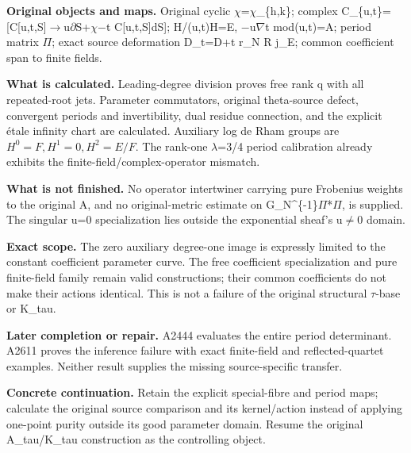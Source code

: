 \textbf{Original objects and maps.} Original cyclic
\allowbreak{}\ensuremath{χ}\allowbreak{}=\allowbreak{}\ensuremath{χ}\allowbreak{}\_\{h,k\};
complex
C\_\{u,t\}=[C[u,t,S]\allowbreak{}\ensuremath{→}\allowbreak{}u\allowbreak{}\ensuremath{∂}\allowbreak{}S+\allowbreak{}\ensuremath{χ}\allowbreak{}\allowbreak{}\ensuremath{−}\allowbreak{}t
C{[}u,t,S{]}dS{]}; H/(u,t)H=E,
\allowbreak{}\ensuremath{−}\allowbreak{}u\allowbreak{}\ensuremath{∇}\allowbreak{}t
mod(u,t)=A; period matrix \allowbreak{}\ensuremath{Π}\allowbreak{};
exact source deformation D\_t=D+t r\_N R j\_E; common coefficient span
to finite fields.

\textbf{What is calculated.} Leading-degree division proves free rank q
with all repeated-root jets. Parameter commutators, original
theta-source defect, convergent periods and invertibility, dual residue
connection, and the explicit étale infinity chart are calculated.
Auxiliary log de Rham groups are \(H^0=F,H^1=0,H^2=E/F\). The rank-one
\allowbreak{}\ensuremath{λ}\allowbreak{}=3/4 period calibration already
exhibits the finite-field/complex-operator mismatch.

\textbf{What is not finished.} No operator intertwiner carrying pure
Frobenius weights to the original A, and no original-metric estimate on
G\_N\textasciicircum{}\{-1\}\allowbreak{}\ensuremath{Π}\allowbreak{}*\allowbreak{}\ensuremath{Π}\allowbreak{},
is supplied. The singular u=0 specialization lies outside the
exponential sheaf's u\allowbreak{}\ensuremath{≠}\allowbreak{}0 domain.

\textbf{Exact scope.} The zero auxiliary degree-one image is expressly
limited to the constant coefficient parameter curve. The free
coefficient specialization and pure finite-field family remain valid
constructions; their common coefficients do not make their actions
identical. This is not a failure of the original structural
\allowbreak{}\ensuremath{τ}\allowbreak{}-base or K\_tau.

\textbf{Later completion or repair.} A2444 evaluates the entire period
determinant. A2611 proves the inference failure with exact finite-field
and reflected-quartet examples. Neither result supplies the missing
source-specific transfer.

\textbf{Concrete continuation.} Retain the explicit special-fibre and
period maps; calculate the original source comparison and its
kernel/action instead of applying one-point purity outside its good
parameter domain. Resume the original A\_tau/K\_tau construction as the
controlling object.

